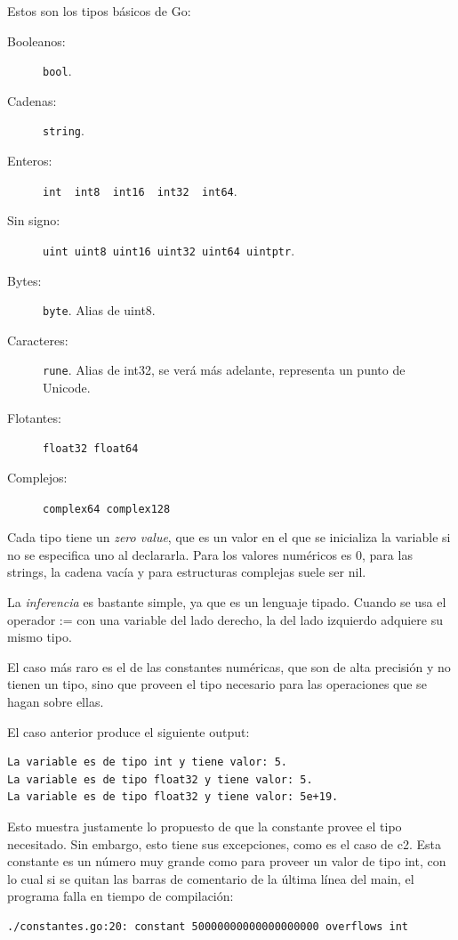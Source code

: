 \documentclass{article}
\begin{document}
Estos son los tipos básicos de Go:
\begin{description}
\item[Booleanos:] \lstinline|bool|.
\item[Cadenas:] \lstinline|string|.
\item[Enteros:] \lstinline|int  int8  int16  int32  int64|.
\item[Sin signo:] \lstinline|uint uint8 uint16 uint32 uint64 uintptr|.
\item[Bytes:] \lstinline|byte|. Alias de uint8.
\item[Caracteres:] \lstinline|rune|. Alias de int32, se verá más adelante, representa un punto de Unicode.
\item[Flotantes:] \lstinline|float32 float64|
\item[Complejos:] \lstinline|complex64 complex128|
\end{description}

Cada tipo tiene un \emph{zero value}, que es un valor en el que se inicializa la variable si no se especifica uno al declararla. Para los valores numéricos es 0, para las strings, la cadena vacía y para estructuras complejas suele ser nil.

La \emph{inferencia} es bastante simple, ya que es un lenguaje tipado. Cuando se usa el operador := con una variable del lado derecho, la del lado izquierdo adquiere su mismo tipo. 

El caso más raro es el de las constantes numéricas, que son de alta precisión y no tienen un tipo, sino que proveen el tipo necesario para las operaciones que se hagan sobre ellas. 

El caso anterior produce el siguiente output: 
\begin{verbatim}
La variable es de tipo int y tiene valor: 5.
La variable es de tipo float32 y tiene valor: 5.
La variable es de tipo float32 y tiene valor: 5e+19.
\end{verbatim}
Esto muestra justamente lo propuesto de que la constante provee el tipo necesitado. Sin embargo, esto tiene sus excepciones, como es el caso de c2. Esta constante es un número muy grande como para  proveer un valor de tipo int, con lo cual si se quitan las barras de comentario de la última línea del main, el programa falla en tiempo de compilación: 

\begin{verbatim}
./constantes.go:20: constant 50000000000000000000 overflows int
\end{verbatim}
\end{document}
